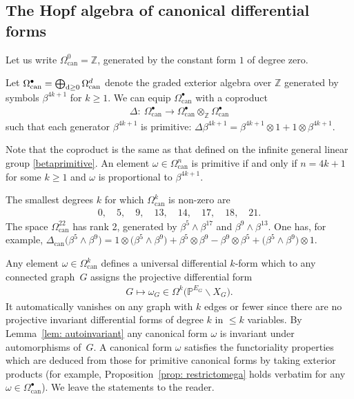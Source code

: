 \documentclass[pdftex]{sigma}%
\numberwithin{equation}{section}
\newcommand{\To}{\longrightarrow}
\newcommand{\Z}{\mathbb Z}
\newcommand{\Pro}{\mathbb P}
\newcommand{\can}{\mathrm{can}}
\newcommand{\0}{\color{blue}{\mathsf{0}}}
\begin{document}
\subsection{The Hopf algebra of canonical differential forms} Let us write
$ \Omega^0_{\can}=\Z$, generated by the constant form $1$ of degree zero.


\begin{defn} Let $\Omega^{\bullet}_{\mathrm{can}} = \bigoplus_{{\rm d}\geq 0} \Omega^d_{\can}$ denote the graded exterior algebra over $\Z$ generated by symbols $\beta^{4k+1}$ for $k\geq 1$. We can equip $\Omega^{\bullet}_{\can}$ with a coproduct
\begin{gather*}
\Delta\colon\ \Omega^{\bullet}_{\can} \To \Omega^{\bullet}_{\mathrm{can}} \otimes_{\Z} \Omega^{\bullet}_{\can}
\end{gather*}
such that each generator $\beta^{4k+1}$ is primitive:
 $\Delta \beta^{4k+1} = \beta^{4k+1} \otimes 1 + 1 \otimes \beta^{4k+1}$.
\end{defn}
Note that the coproduct is the same as that defined on the infinite general linear group \eqref{betaprimitive}.
An element $\omega \in \Omega^n_{\can}$ is primitive if and only if $n= 4k+1$ for some $k\geq 1$ and $\omega$ is proportional to $\beta^{4k+1}$.

\begin{Example} %
The smallest degrees $k$ for which $\Omega^k_{\can}$ is non-zero are
\begin{gather*}
0,\quad 5,\quad 9,\quad 13,\quad 14,\quad 17,\quad 18,\quad 21.
\end{gather*}
The space $\Omega^{22}_{\can}$ has rank 2, generated by $\beta^{5} \wedge \beta^{17}$ and $\beta^{9} \wedge \beta^{13}$. One has, for example,
\mbox{$\Delta_{\can} \big(\beta^5 \wedge \beta^9\big) = 1 \otimes \big(\beta^5 \wedge \beta^9\big) + \beta^5 \otimes \beta^9 - \beta^9 \otimes \beta^5 + \big(\beta^5 \wedge \beta^9\big) \otimes 1$}.
 \end{Example}

 Any element $\omega \in \Omega^{k}_{\can}$ defines a universal differential $k$-form which to any connected graph~$G$ assigns the projective differential form
\begin{gather*}
G \mapsto \omega_G \in \Omega^k \big(\Pro^{E_G} \backslash X_G\big).
\end{gather*}
It automatically vanishes on any graph with $k$ edges or fewer since there are no projective invariant differential forms of degree $k$ in $\leq k$ variables.
By Lemma~\ref{lem: autoinvariant} any canonical form $\omega$ is invariant under automorphisms of~$G$. A canonical form $\omega$ satisfies the functoriality properties which are deduced from those for primitive canonical forms by taking exterior products (for example, Proposition~\ref{prop: restrictomega} holds verbatim for any $\omega \in \Omega^{\bullet}_{\can}$). We leave the statements to the reader.
\end{document}
